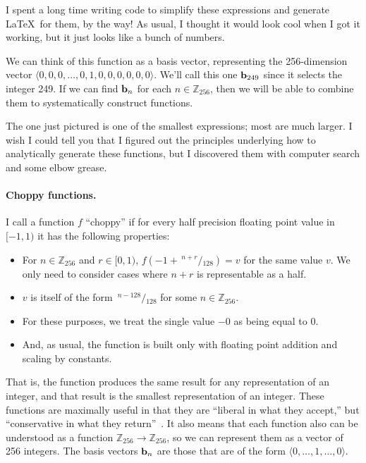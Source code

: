\documentclass[twocolumn]{article}
\newcommand\sfrac[2]{\!{}\,^{#1}\!/{}\!_{#2}}
\newcommand\basis{\ensuremath{\textrm{\bf b}}}
\begin{document}
I spent a long time writing code to simplify these expressions and
generate \LaTeX\ for them, by the way! As usual, I thought it would
look cool when I got it working, but it just looks like a bunch of numbers.

We can think of this function as a basis vector, representing the 256-dimension
vector $\langle 0, 0, 0, \ldots, 0, 1, 0, 0, 0, 0, 0, 0 \rangle$. We'll call
this one $\basis_{249}$ since it selects the integer 249. If we can find $\basis_n$
for each $n \in \mathbb{Z}_{256}$, then we will be able to combine them
to systematically construct functions.

The one just pictured is one of the smallest expressions; most are
much larger. I wish I could tell you that I figured out the principles
underlying how to analytically generate these functions, but I
discovered them with computer search and some elbow grease.

\paragraph{Choppy functions.}
I call a function $f$ ``choppy'' if for every half precision floating point value in
$[-1, 1)$ it has the following properties:

\begin{itemize}
\item For $n \in \mathbb{Z}_{256}$ and $r \in [0, 1)$,
  $f(-1 + \sfrac{n + r}{128}) = v$ for the same value $v$. We only need to
  consider cases where $n + r$ is representable as a half.
\item $v$ is itself of the form $\sfrac{n - 128}{128}$ for some $n \in \mathbb{Z}_{256}$.
\item For these purposes, we treat the single value $-0$ as being equal to $0$.
\item And, as usual, the function is built only with floating point addition
  and scaling by constants.
\end{itemize}

That is, the function produces the same result for any representation
of an integer, and that result is the smallest representation of an
integer. These functions are maximally useful in that they are
``liberal in what they accept,'' but ``conservative in what they
return''~\cite{rfc761}. It also means that each function also can be
understood as a function $\mathbb{Z}_{256} \rightarrow
\mathbb{Z}_{256}$, so we can represent them as a vector of 256
integers. The basis vectors $\basis_n$ are those that are of the form
$\langle 0, \ldots, 1, \ldots, 0\rangle$.
\end{document}
